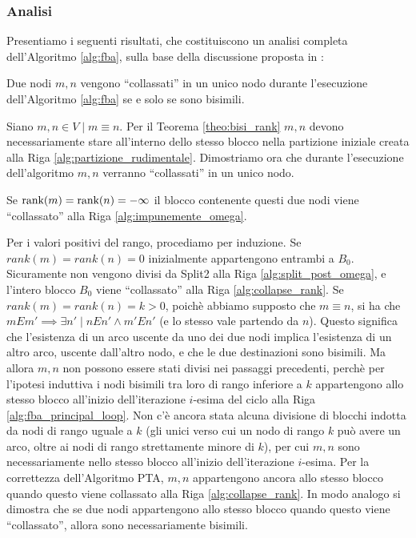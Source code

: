 \subsubsection{Analisi}
Presentiamo i seguenti risultati, che costituiscono un analisi completa dell'Algoritmo \ref{alg:fba}, sulla base della discussione proposta in \cite{dovier}:
\begin{theorem}
    Due nodi $m,n$ vengono ``collassati'' in un unico nodo durante l'esecuzione dell'Algoritmo \ref{alg:fba} se e solo se sono bisimili.
\end{theorem}
\begin{proof2}
    Siano $m,n \in V \mid m \equiv n$. Per il Teorema \ref{theo:bisi_rank} $m,n$ devono necessariamente stare all'interno dello stesso blocco nella partizione iniziale creata alla Riga \ref{alg:partizione_rudimentale}. Dimostriamo ora che durante l'esecuzione dell'algoritmo $m,n$ verranno ``collassati'' in un unico nodo.

    Se $\textup{rank}(m) = \textup{rank}(n) = -\infty$ il blocco contenente questi due nodi viene ``collassato'' alla Riga \ref{alg:impunemente_omega}.

    Per i valori positivi del rango, procediamo per induzione. Se $rank(m) = rank(n) = 0$ inizialmente appartengono entrambi a $B_0$. Sicuramente non vengono divisi da Split2 alla Riga \ref{alg:split_post_omega}, e l'intero blocco $B_0$ viene ``collassato'' alla Riga \ref{alg:collapse_rank}. Se $rank(m) = rank(n) = k > 0$, poichè abbiamo supposto che $m \equiv n$, si ha che $m E m' \implies \exists n' \mid n E n' \land m' E n'$ (e lo stesso vale partendo da $n$). Questo significa che l'esistenza di un arco uscente da uno dei due nodi implica l'esistenza di un altro arco, uscente dall'altro nodo, e che le due destinazioni sono bisimili. Ma allora $m,n$ non possono essere stati divisi nei passaggi precedenti, perchè per l'ipotesi induttiva i nodi bisimili tra loro di rango inferiore a $k$ appartengono allo stesso blocco all'inizio dell'iterazione $i$-esima del ciclo alla Riga \ref{alg:fba_principal_loop}. Non c'è ancora stata alcuna divisione di blocchi indotta da nodi di rango uguale a $k$ (gli unici verso cui un nodo di rango $k$ può avere un arco, oltre ai nodi di rango strettamente minore di $k$), per cui $m,n$ sono necessariamente nello stesso blocco all'inizio dell'iterazione $i$-esima. Per la correttezza dell'Algoritmo PTA, $m,n$ appartengono ancora allo stesso blocco quando questo viene collassato alla Riga \ref{alg:collapse_rank}. In modo analogo si dimostra che se due nodi appartengono allo stesso blocco quando questo viene ``collassato'', allora sono necessariamente bisimili.
\end{proof2}

